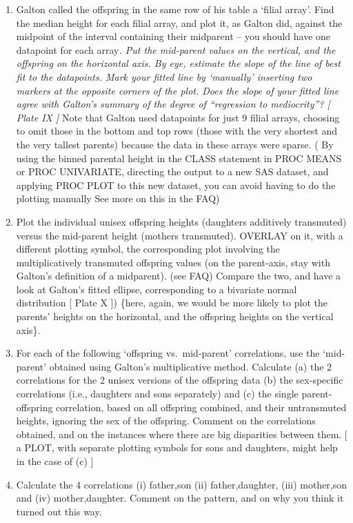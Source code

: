 \documentclass[]{book}
\begin{document}
\begin{enumerate}
\item
  Galton called the offspring in the same row of his table a `filial array'. Find the median height for each filial array, and plot it, as Galton did, against the midpoint of the interval containing their midparent -- you should have one datapoint for each array\emph{. Put the mid-parent values on the vertical, and the offspring on the horizontal axis. By eye, estimate the slope of the line of best fit to the datapoints. Mark your fitted line by `manually' inserting two markers at the opposite corners of the plot. Does the slope of your fitted line agree with Galton's summary of the degree of ``regression to mediocrity''? {[} Plate IX {]} }Note that Galton used datapoints for just 9 filial arrays, choosing to omit those in the bottom and top rows (those with the very shortest and the very tallest parents) because the data in these arrays were sparse. ( By using the binned parental height in the CLASS statement in PROC MEANS or PROC UNIVARIATE, directing the output to a new SAS dataset, and applying PROC PLOT to this new dataset, you can avoid having to do the plotting manually See more on this in the FAQ)
\item
  Plot the individual unisex offspring heights (daughters additively transmuted) versus the mid-parent height (mothers transmuted). OVERLAY on it, with a different plotting symbol, the corresponding plot involving the multiplicatively transmuted offspring values (on the parent-axis, stay with Galton's definition of a midparent). (see FAQ) Compare the two, and have a look at Galton's fitted ellipse, corresponding to a bivariate normal distribution {[} Plate X {]}) \{here, again, we would be more likely to plot the parents' heights on the horizontal, and the offspring heights on the vertical axis\}.
\item
  For each of the following `offspring vs.~mid-parent' correlations, use the `mid-parent' obtained using Galton's multiplicative method. Calculate (a) the 2 correlations for the 2 unisex versions of the offspring data (b) the sex-specific correlations (i.e., daughters and sons separately) and (c) the single parent-offspring correlation, based on all offspring combined, and their untransmuted heights, ignoring the sex of the offspring. Comment on the correlations obtained, and on the instances where there are big disparities between them. {[} a PLOT, with separate plotting symbols for sons and daughters, might help in the case of (c) {]}
\item
  Calculate the 4 correlations (i) father,son (ii) father,daughter, (iii) mother,son and (iv) mother,daughter. Comment on the pattern, and on why you think it turned out this way.
\end{enumerate}
\end{document}
